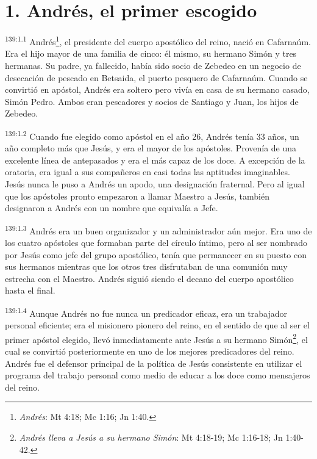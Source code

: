 \section*{1. Andrés, el primer escogido}
\par
\textsuperscript{139:1.1} Andrés\footnote{\textit{Andrés}: Mt 4:18; Mc 1:16; Jn 1:40.}, el presidente del cuerpo apostólico del reino, nació en Cafarnaúm. Era el hijo mayor de una familia de cinco: él mismo, su hermano Simón y tres hermanas. Su padre, ya fallecido, había sido socio de Zebedeo en un negocio de desecación de pescado en Betsaida, el puerto pesquero de Cafarnaúm. Cuando se convirtió en apóstol, Andrés era soltero pero vivía en casa de su hermano casado, Simón Pedro. Ambos eran pescadores y socios de Santiago y Juan, los hijos de Zebedeo.

\par
\textsuperscript{139:1.2} Cuando fue elegido como apóstol en el año 26, Andrés tenía 33 años, un año completo más que Jesús, y era el mayor de los apóstoles. Provenía de una excelente línea de antepasados y era el más capaz de los doce. A excepción de la oratoria, era igual a sus compañeros en casi todas las aptitudes imaginables. Jesús nunca le puso a Andrés un apodo, una designación fraternal. Pero al igual que los apóstoles pronto empezaron a llamar Maestro a Jesús, también designaron a Andrés con un nombre que equivalía a Jefe.

\par
\textsuperscript{139:1.3} Andrés era un buen organizador y un administrador aún mejor. Era uno de los cuatro apóstoles que formaban parte del círculo íntimo, pero al ser nombrado por Jesús como jefe del grupo apostólico, tenía que permanecer en su puesto con sus hermanos mientras que los otros tres disfrutaban de una comunión muy estrecha con el Maestro. Andrés siguió siendo el decano del cuerpo apostólico hasta el final.

\par
\textsuperscript{139:1.4} Aunque Andrés no fue nunca un predicador eficaz, era un trabajador personal eficiente; era el misionero pionero del reino, en el sentido de que al ser el primer apóstol elegido, llevó inmediatamente ante Jesús a su hermano Simón\footnote{\textit{Andrés lleva a Jesús a su hermano Simón}: Mt 4:18-19; Mc 1:16-18; Jn 1:40-42.}, el cual se convirtió posteriormente en uno de los mejores predicadores del reino. Andrés fue el defensor principal de la política de Jesús consistente en utilizar el programa del trabajo personal como medio de educar a los doce como mensajeros del reino.

